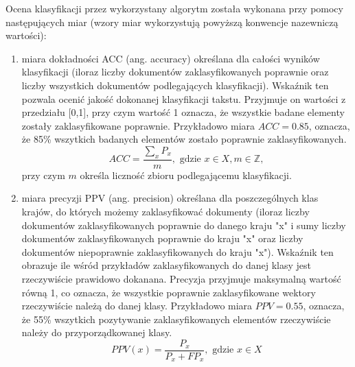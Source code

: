 \documentclass{classrep}
\begin{document}
Ocena klasyfikacji przez wykorzystany algorytm została wykonana przy pomocy następujących miar \cite{tablicapomylek} (wzory miar wykorzystują powyższą konwencje nazewniczą wartości):\\
\begin{enumerate}
\item miara dokładności ACC (ang. accuracy) określana dla całości wyników klasyfikacji (iloraz liczby dokumentów zaklasyfikowanych poprawnie oraz liczby wszystkich dokumentów podlegających klasyfikacji).
Wskaźnik ten pozwala ocenić jakość dokonanej klasyfikacji takstu. Przyjmuje on wartości z przedziału [0,1], przy czym wartość 1 oznacza, że wszystkie badane elementy zostały zaklasyfikowane poprawnie.
Przykładowo miara $ACC =  0.85$, oznacza, że 85\% wszytkich badanych elementów zostało poprawnie zaklasyfikowanych. 
  \begin{equation}
    ACC = \frac{\sum_{x} P_x }{m}, \text{ gdzie }x\in X, m \in \mathbb{Z}, 
  \end{equation}
przy czym \(m\) określa liczność zbioru podlegającemu klasyfikacji.\\

\item miara precyzji PPV (ang. precision) określana dla poszczególnych klas krajów, do których możemy zaklasyfikować dokumenty (iloraz liczby dokumentów zaklasyfikowanych poprawnie do danego kraju "x" i sumy liczby dokumentów zaklasyfikowanych poprawnie do kraju "x" oraz liczby dokumentów niepoprawnie zaklasyfikowanych do kraju "x").
Wskaźnik ten obrazuje ile wśród przykładów zaklasyfikowanych do danej klasy jest rzeczywiście prawidowo dokanana. Precyzja przyjmuje maksymalną wartość równą 1, co oznacza, że wszystkie poprawnie zaklasyfikowane wektory rzeczywiście należą do danej klasy. 
Przykładowo miara $PPV =  0.55$, oznacza, że 55\% wszytkich pozytywanie zaklasyfikowanych elementów rzeczywiście należy do przyporządkowanej klasy. 
  \begin{equation}
    PPV(x) = \frac{P_x}{ P_x + FP_x}, \text{ gdzie } x\in X
  \end{equation}



\end{enumerate}
\end{document}
